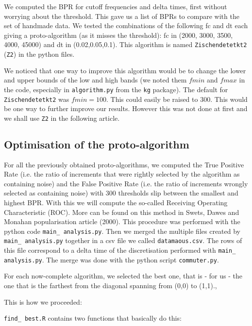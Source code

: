 We computed the BPR for cutoff frequencies and delta times, first without worrying about the threshold. This gave us a list of BPRs to compare with the set of handmade data. We tested the combinations of the following fc and dt each giving a proto-algorithm (as it misses the threshold): fc in (2000, 3000, 3500, 4000, 45000) and dt in (0.02,0.05,0.1). This algorithm is named {\tt Zischendetetkt2} ({\tt Z2}) in the python files.

We noticed that one way to improve this algorithm would be to change the lower and upper bounds of the low and high bands (we noted them $fmin$ and $fmax$ in the code, especially in {\tt algorithm.py} from the {\tt kg} package). The default for {\tt Zischendetetkt2} was $fmin=100$. This could easily be raised to $300$. This would be one way to further improve our results. However this was not done at first and we shall use {\tt Z2} in the following article.

\subsection{Optimisation of the proto-algorithm} For all the previously obtained proto-algorithms, we computed the True Positive Rate (i.e. the ratio of increments that were rightly selected by the algorithm as containing noise) and the False Positive Rate (i.e. the ratio of increments wrongly selected as containing noise) with 300 thresholds slip between the smallest and highest BPR. With this we will compute the so-called Receiving Operating Characteristic (ROC). More can be found on this method in Swets, Dawes and Monahan popularisation article (2000). This procedure was performed with the python code {\tt main\_ analysis.py}. Then we merged the multiple files created by {\tt main\_ analysis.py} together in a csv file we called {\tt datamaous.csv}. The rows of this file correspond to a delta time of the discretisation performed with {\tt main\_ analysis.py}. The merge was done with the python script {\tt commuter.py}.

For each now-complete algorithm, we selected the best one, that is - for us - the one that is the farthest from the diagonal spanning from (0,0) to (1,1).,

This is how we proceeded:



{\tt find\_ best.R} contains two functions that basically do this:

